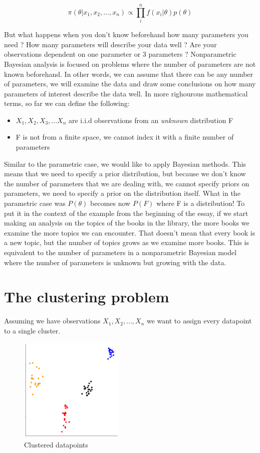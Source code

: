 \documentclass{article}
\begin{document}
$$\pi(\theta|x_{1}, x_{2}, ..., x_{n}) \propto \prod_{i}^{n}f(x_{i}|\theta)p(\theta)$$


But what happens when you don't know beforehand how many parameters you need ? How many parameters will describe
your data well ? Are your observations dependent on one parameter or 3 parameters ? Nonparametric Bayesian analysis
is focused on problems where the number of parameters are not known beforehand. In other words, we can assume that
there can be any number of parameters, we will examine the data and draw some conclusions on how many parameters of 
interest describe the data well. 
In more righourous mathematical terms, so far we can define the following:

\begin{itemize}
    \item $X_{1}, X_{2}, X_{3}, ... X_{n}$ are i.i.d observations from an \textit{unknown} distribution F
    \item F is not from a finite space, we cannot index it with a finite number of parameters
\end{itemize}

Similar to the parametric case, we would like to apply Bayesian methods. This means that we need to 
specify a prior distribution, but because we don't know the number of parameters that we are dealing with,
we cannot specify priors on parameters, we need to specify a prior on the distribution itself. What in 
the parametric case was $P(\theta)$ becomes now $P(F)$ where F is a distribution! 
To put it in the context of the example from the beginning of the essay, if we start making an analysis on
the topics of the books in the library, the more books we examine the more topics we can encounter. That doesn't
mean that every book is a new topic, but the number of topics grows as we examine more books. This is equivalent
to the number of parameters in a nonparametric Bayesian model where the number of parameters is unknown but growing
with the data. 

\section{The clustering problem}
Assuming we have observations $X_{1}, X_{2}, ..., X_{n}$ we want to assign every datapoint to a single cluster.

\begin{figure} [H]
    \begin{center}
        \includegraphics[scale=0.3, width=5cm]{clusters.png}
        \caption{Clustered datapoints}
        \label{fig:boat1}
    \end{center}
\end{figure}
\end{document}
